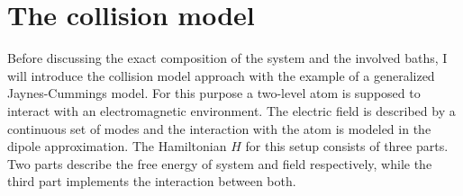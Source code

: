 \section{The collision model}\label{sec:collision_model}
%
Before discussing the exact composition of the system and the involved baths, I will introduce the collision model approach with the example of a generalized Jaynes-Cummings model. For this purpose a two-level atom is supposed to interact with an electromagnetic environment. The electric field is described by a continuous set of modes and the interaction with the atom is modeled in the dipole approximation. The Hamiltonian $H$ for this setup consists of three parts. Two parts describe the free energy of system and field respectively, while the third part implements the interaction between both.
